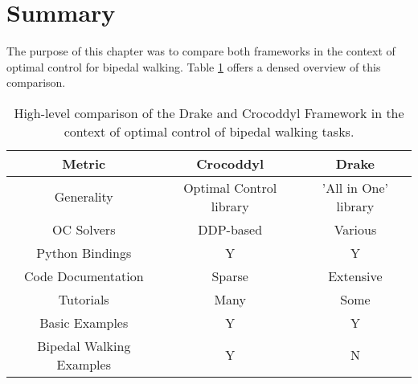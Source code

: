 \section{Summary}
The purpose of this chapter was to compare both frameworks in the context of optimal control for bipedal walking. Table \ref{tab:comparison} offers a densed overview of this comparison.

\begin{table}[h!]
\centering
\begin{tabular}{|c|c|c|}
\hline
\textbf{Metric} & \textbf{Crocoddyl} & \textbf{Drake} \\ \hline
Generality & Optimal Control library & 'All in One' library \\ \hline
OC Solvers & DDP-based & Various  \\ \hline 
Python Bindings & Y & Y \\ \hline
Code Documentation & Sparse & Extensive \\ \hline	
Tutorials & Many & Some \\ \hline
Basic Examples & Y & Y \\ \hline
Bipedal Walking Examples & Y & N \\ \hline
\end{tabular}
\caption{High-level comparison of the Drake and Crocoddyl Framework in the context of optimal control of bipedal walking tasks.}
\label{tab:comparison}
\end{table}


 









